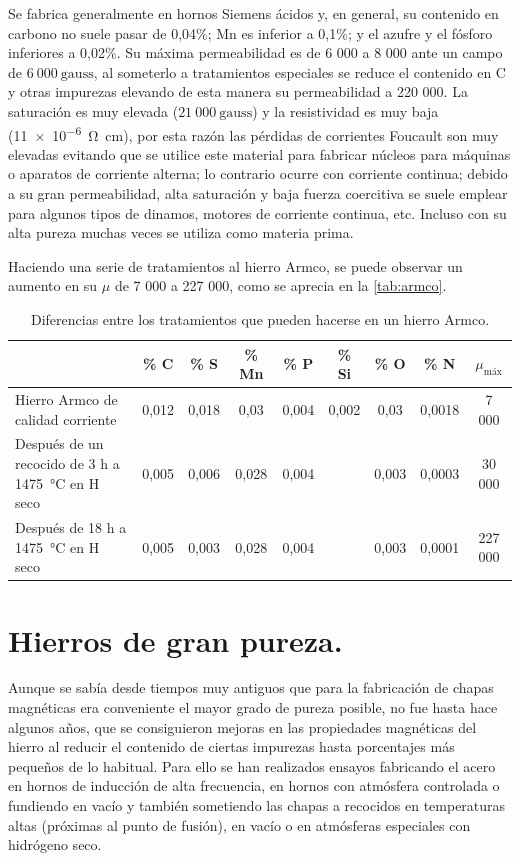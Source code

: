 \documentclass[12pt,a4paper]{article}
\begin{document}
Se fabrica generalmente en hornos Siemens ácidos y, en general, su contenido en carbono no suele pasar de 0,04\%; Mn es inferior a 0,1\%; y el azufre y el fósforo inferiores a 0,02\%. Su máxima permeabilidad es de 6 000 a 8 000 ante un campo de $6\ 000\ \mathrm{gauss}$, al someterlo a tratamientos especiales se reduce el contenido en C y otras impurezas elevando de esta manera su permeabilidad a 220 000. La saturación es muy elevada ($21\ 000\ \mathrm{gauss}$) y la resistividad es muy baja (\SI{11e-6}{\ohm\centi\metre}), por esta razón las pérdidas de corrientes Foucault son muy elevadas evitando que se utilice este material para fabricar núcleos para máquinas o aparatos de corriente alterna; lo contrario ocurre con corriente continua; debido a su gran permeabilidad, alta saturación y baja fuerza coercitiva se suele emplear para algunos tipos de dinamos, motores de corriente continua, etc. Incluso con su alta pureza muchas veces se utiliza como materia prima.

Haciendo una serie de tratamientos al hierro Armco, se puede observar un aumento en su $\mu$ de 7 000 a 227 000, como se aprecia en la \autoref{tab:armco}.

\begin{table}[H]
    \centering
    \begin{tabularx}{\textwidth}{X|c|c|c|c|c|c|c|c}
        & \% C & \% S & \% Mn & \% P & \% Si & \% O & \% N & $\mu_{\text{máx}}$ \\ \hline
        Hierro Armco de calidad corriente & 0,012 & 0,018 & 0,03 & 0,004 & 0,002 & 0,03 & 0,0018 & 7 000 \\
        Después de un recocido de 3 h a \SI{1475}{\celsius} en H seco & 0,005 & 0,006 & 0,028 & 0,004 &  & 0,003 & 0,0003 & 30 000 \\
        Después de 18 h a \SI{1475}{\celsius} en H seco & 0,005 & 0,003 & 0,028 & 0,004 &  & 0,003 & 0,0001 & 227 000 \\
    \end{tabularx}
    \caption{Diferencias entre los tratamientos que pueden hacerse en un hierro Armco.}
    \label{tab:armco}
\end{table}

\section{Hierros de gran pureza.}

Aunque se sabía desde tiempos muy antiguos que para la fabricación de chapas magnéticas era conveniente el mayor grado de pureza posible, no fue hasta hace algunos años, que se consiguieron mejoras en las propiedades magnéticas del hierro al reducir el contenido de ciertas impurezas hasta porcentajes más pequeños de lo habitual. Para ello se han realizados ensayos fabricando el acero en hornos de inducción de alta frecuencia, en hornos con atmósfera controlada o fundiendo en vacío y también sometiendo las chapas a recocidos en temperaturas altas (próximas al punto de fusión), en vacío o en atmósferas especiales con hidrógeno seco. 
\end{document}
